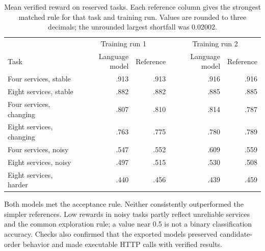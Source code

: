 \documentclass{strategynet-journal}
\begin{document}
\begin{table}[H]
\centering
\small
\caption{Mean verified reward on reserved tasks. Each reference column gives
the strongest matched rule for that task and training run. Values are rounded
to three decimals; the unrounded largest shortfall was 0.02002.}
\begin{tabular}{lrrrr}
\toprule
& \multicolumn{2}{c}{Training run 1} & \multicolumn{2}{c}{Training run 2} \\
Task & Language model & Reference & Language model & Reference \\
\midrule
Four services, stable & .913 & .913 & .916 & .916 \\
Eight services, stable & .882 & .882 & .885 & .885 \\
Four services, changing & .807 & .810 & .814 & .787 \\
Eight services, changing & .763 & .775 & .780 & .789 \\
Four services, noisy & .547 & .552 & .609 & .559 \\
Eight services, noisy & .497 & .515 & .530 & .508 \\
Eight services, harder & .440 & .456 & .439 & .459 \\
\bottomrule
\end{tabular}
\label{tab:language-results}
\end{table}

Both models met the acceptance rule. Neither consistently outperformed the
simpler references. Low rewards in noisy tasks partly reflect unreliable
services and the common exploration rule; a value near 0.5 is not a binary
classification accuracy. Checks also confirmed that the exported models
preserved candidate-order behavior and made executable HTTP calls with
verified results.
\end{document}
